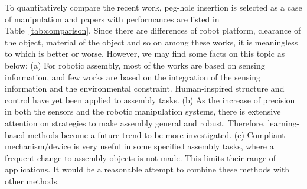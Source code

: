 \documentclass[journal,twoside,web]{ieeecolor}
\begin{document}
To quantitatively compare the recent work, peg-hole insertion is selected as a case of manipulation and papers with performances are listed in Table~\ref{tab:comparison}.  
Since there are differences of robot platform, clearance of the object, material of the object and so on among these works, it is meaningless to which is better or worse. 
However, we may find some facts on this topic as below:
(a) For robotic assembly, most of the works are based on sensing information, and few works are based on the integration of the sensing information and the environmental constraint. Human-inspired structure and control have yet been applied to assembly tasks. 
(b) As the increase of precision in both the sensors and the robotic manipulation systems, there is extensive attention on strategies to make assembly general and robust. Therefore, learning-based methods become a future trend to be more investigated.
(c) Compliant mechanism/device is very useful in some specified assembly tasks, where a frequent change to assembly objects is not made. This limits their range of applications. It would be a reasonable attempt to combine these methods with other methods.
\end{document}
